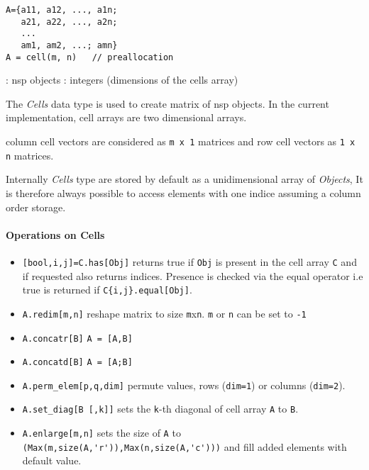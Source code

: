 
\begin{mandesc}
\end{mandesc}
\begin{calling_sequence}
\begin{verbatim}
A={a11, a12, ..., a1n;
   a21, a22, ..., a2n;
   ...
   am1, am2, ...; amn}
A = cell(m, n)   // preallocation
\end{verbatim}
\end{calling_sequence}
\begin{parameters}
  \begin{varlist}
    : nsp objects
    : integers (dimensions of the cells array)
  \end{varlist}
\end{parameters}

\begin{mandescription}

The \emph{Cells} data type is used to create matrix of nsp objects. 
In the current implementation, cell arrays are two dimensional arrays. 

column cell vectors are considered as \verb!m x 1! matrices and row cell vectors
as \verb!1 x n! matrices.

Internally \emph{Cells} type are stored by default as a unidimensional array of \emph{Objects},
It is therefore always possible to access elements with one indice assuming a column order 
storage. 
\end{mandescription}

\paragraph{Operations on Cells}
\begin{itemize}
\item \verb+[bool,i,j]=C.has[Obj]+ returns true if \verb+Obj+ is present in the cell array \verb+C+ and if requested also returns indices. 
  Presence is checked via the equal operator i.e true is returned if \verb+C{i,j}.equal[Obj]+.
\end{itemize}
\begin{itemize}
\item \verb+A.redim[m,n]+ reshape matrix to size \verb+m+x\verb+n+. \verb+m+ or \verb+n+ can be set to \verb+-1+ 
\item \verb+A.concatr[B]+ \verb+A = [A,B]+
\item \verb+A.concatd[B]+ \verb+A = [A;B]+
\item \verb+A.perm_elem[p,q,dim]+ permute values, rows (\verb+dim=1+) or columns (\verb+dim=2+).
\item \verb+A.set_diag[B [,k]]+ sets the \verb+k+-th diagonal of cell array \verb+A+ to \verb+B+.
\item \verb+A.enlarge[m,n]+ sets the size of \verb+A+ to \verb+(Max(m,size(A,'r')),Max(n,size(A,'c')))+ and fill 
  added elements with default value.
\end{itemize}

